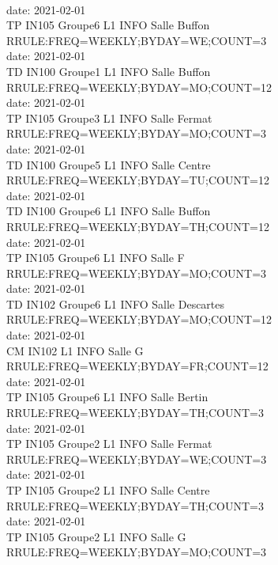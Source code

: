 \documentclass{ltxdoc}
\begin{document}
\begin{center}
\\ date: 2021-02-01\\TP  IN105  Groupe6  L1 INFO  Salle Buffon\\RRULE:FREQ=WEEKLY;BYDAY=WE;COUNT=3
\\ date: 2021-02-01\\TD  IN100  Groupe1  L1 INFO  Salle Buffon\\RRULE:FREQ=WEEKLY;BYDAY=MO;COUNT=12
\\ date: 2021-02-01\\TP  IN105  Groupe3  L1 INFO  Salle Fermat\\RRULE:FREQ=WEEKLY;BYDAY=MO;COUNT=3
\\ date: 2021-02-01\\TD  IN100  Groupe5  L1 INFO  Salle Centre\\RRULE:FREQ=WEEKLY;BYDAY=TU;COUNT=12
\\ date: 2021-02-01\\TD  IN100  Groupe6  L1 INFO  Salle Buffon\\RRULE:FREQ=WEEKLY;BYDAY=TH;COUNT=12
\\ date: 2021-02-01\\TP  IN105  Groupe6  L1 INFO  Salle F\\RRULE:FREQ=WEEKLY;BYDAY=MO;COUNT=3
\\ date: 2021-02-01\\TD  IN102  Groupe6  L1 INFO  Salle Descartes\\RRULE:FREQ=WEEKLY;BYDAY=MO;COUNT=12
\\ date: 2021-02-01\\CM  IN102    L1 INFO  Salle G\\RRULE:FREQ=WEEKLY;BYDAY=FR;COUNT=12
\\ date: 2021-02-01\\TP  IN105  Groupe6  L1 INFO  Salle Bertin\\RRULE:FREQ=WEEKLY;BYDAY=TH;COUNT=3
\\ date: 2021-02-01\\TP  IN105  Groupe2  L1 INFO  Salle Fermat\\RRULE:FREQ=WEEKLY;BYDAY=WE;COUNT=3
\\ date: 2021-02-01\\TP  IN105  Groupe2  L1 INFO  Salle Centre\\RRULE:FREQ=WEEKLY;BYDAY=TH;COUNT=3
\\ date: 2021-02-01\\TP  IN105  Groupe2  L1 INFO  Salle G\\RRULE:FREQ=WEEKLY;BYDAY=MO;COUNT=3

\end{center}
\end{document}
